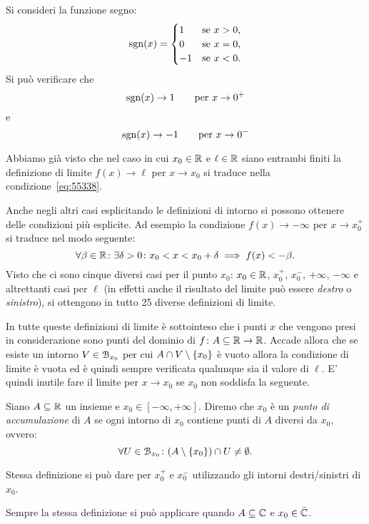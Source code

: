 \begin{example}
Si consideri la funzione segno:
\[
\operatorname{sgn}(x) =
\begin{cases}
  1 & \text{se $x>0$},\\
  0 & \text{se $x=0$},\\
  -1 & \text{se $x<0$}.
\end{cases}
\]
Si può verificare che
\[
\operatorname{sgn}(x) \to 1 \qquad \text{per $x\to 0^+$}
\]
e
\[
\operatorname{sgn}(x) \to -1 \qquad \text{per $x\to 0^-$}
\]
\end{example}

Abbiamo già visto che nel caso in cui $x_0\in {\mathbb R}$ e $\ell\in {\mathbb R}$ 
siano entrambi finiti 
la definizione di limite $f(x)\to \ell$ per $x\to x_0$
si traduce nella condizione~\eqref{eq:55338}.

Anche negli altri casi esplicitando le definizioni di intorno
si possono ottenere delle condizioni più esplicite.
Ad esempio la condizione $f(x)\to -\infty$ per $x\to x_0^+$
si traduce nel modo seguente:
\[
\forall \beta\in {\mathbb R}\colon \exists \delta>0 \colon x_0 < x < x_0+\delta 
\implies f(x) < -\beta.  
\]
Visto che ci sono cinque diversi casi per il punto $x_0$:
$x_0\in {\mathbb R}$, $x_0^+$, $x_0^-$, $+\infty$, $-\infty$ e altrettanti 
casi per $\ell$ (in effetti anche il risultato del limite 
può essere \emph{destro} o \emph{sinistro}), si ottengono 
in tutto 25 diverse definizioni di limite.

In tutte queste definizioni di limite è sottointeso che i punti 
$x$ che vengono presi in considerazione sono punti 
del dominio di $f\colon A \subseteq {\mathbb R} \to {\mathbb R}$.
Accade allora che se esiste un intorno $V\in \mathcal B_{x_0}$
per cui $A \cap V \setminus {\left\{ x_0 \right\}}$ è vuoto allora 
la condizione di limite è vuota ed è quindi sempre verificata 
qualunque sia il valore di $\ell$. 
E' quindi inutile fare il limite per $x\to x_0$ 
se $x_0$ non soddisfa la seguente.

\begin{definition}
  \mymark{*}
  Siano $A\subseteq  {\mathbb R}$ un insieme e $x_0\in [-\infty, +\infty]$.
  Diremo che $x_0$ è un \emph{punto di accumulazione}%
%
 di $A$
  se ogni intorno di $x_0$ contiene punti di $A$ diversi da $x_0$, ovvero:
  \[
   \forall U \in \mathcal B_{x_0}\colon (A\setminus {\left\{ x_0 \right\}}) \cap U \neq \emptyset.
  \]

  Stessa definizione si può dare per $x_0^+$ e $x_0^-$ 
  utilizzando gli intorni destri/sinistri di $x_0$. 

  Sempre la stessa definizione si può applicare 
  quando $A\subseteq {\mathbb C}$ e $x_0\in \bar {{\mathbb C}}$.
\end{definition}

